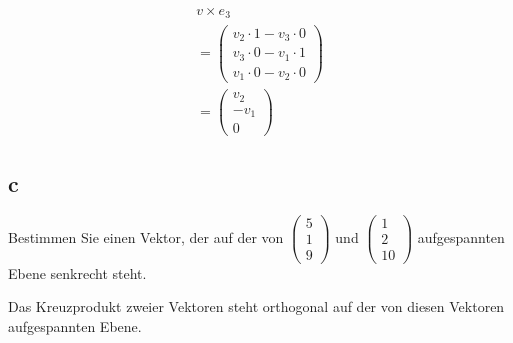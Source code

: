 \begin{align*}
    v \times e_3                \\
    = \begin{pmatrix}
          v_2 \cdot 1 - v_3 \cdot 0 \\
          v_3 \cdot 0 - v_1 \cdot 1 \\
          v_1 \cdot 0 - v_2 \cdot 0
      \end{pmatrix} \\
    = \begin{pmatrix}
          v_2 \\ -v_1 \\ 0
      \end{pmatrix}
\end{align*}

\subsection{c}
Bestimmen Sie einen Vektor, der auf der von $\begin{pmatrix}5 \\ 1 \\ 9\end{pmatrix}$ und $\begin{pmatrix}1 \\ 2 \\ 10\end{pmatrix}$ aufgespannten Ebene senkrecht steht.

Das Kreuzprodukt zweier Vektoren steht orthogonal auf der von diesen Vektoren
aufgespannten Ebene.

